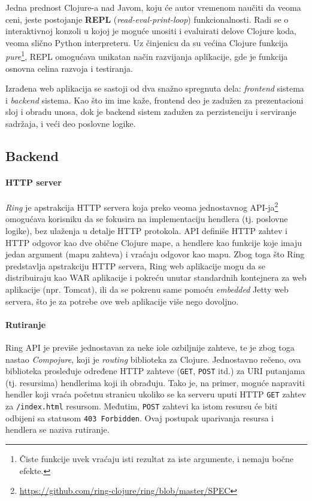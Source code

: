 Jedna prednost Clojure-a nad Javom, koju će autor vremenom naučiti da veoma ceni, jeste postojanje \textbf{REPL} (\textit{read-eval-print-loop}) funkcionalnosti. Radi se o interaktivnoj konzoli u kojoj je moguće unositi i evaluirati delove Clojure koda, veoma slično Python interpreteru. Uz činjenicu da su većina Clojure funkcija \textit{pure}\footnote{Čiste funkcije uvek vraćaju isti rezultat za iste argumente, i nemaju bočne efekte.}, REPL omogućava unikatan način razvijanja aplikacije, gde je funkcija osnovna celina razvoja i testiranja.

Izrađena web aplikacija se sastoji od dva snažno spregnuta dela: \emph{frontend} sistema i \emph{backend} sistema. Kao što im ime kaže, frontend deo je zadužen za prezentacioni sloj i obradu unosa, dok je backend sistem zadužen za perzistenciju i serviranje sadržaja, i veći deo poslovne logike.

\subsection{Backend}

\paragraph{HTTP server}
\emph{Ring}\cite{ring} je apstrakcija HTTP servera koja preko veoma jednostavnog API-ja\footnote{\url{https://github.com/ring-clojure/ring/blob/master/SPEC}} omogućava korisniku da se fokusira na implementaciju hendlera (tj. poslovne logike), bez ulaženja u detalje HTTP protokola. API definiše HTTP zahtev i HTTP odgovor kao dve obične Clojure mape, a hendlere kao funkcije koje imaju jedan argument (mapu zahteva) i vraćaju odgovor kao mapu. Zbog toga što Ring predstavlja apstrakciju HTTP servera, Ring web aplikacije mogu da se distribuiraju kao WAR aplikacije i pokreću unutar standardnih kontejnera za web aplikacije (npr. Tomcat), ili da se pokrenu same pomoću \textit{embedded} Jetty web servera, što je za potrebe ove web aplikacije više nego dovoljno.

\paragraph{Rutiranje}
Ring API je previše jednostavan za neke iole ozbiljnije zahteve, te je zbog toga nastao \emph{Compojure}\cite{compojure}, koji je \textit{routing} biblioteka za Clojure. Jednostavno rečeno, ova biblioteka prosleđuje određene HTTP zahteve (\texttt{GET}, \texttt{POST} itd.) za URI putanjama (tj. resursima) hendlerima koji ih obrađuju. Tako je, na primer, moguće napraviti hendler koji vraća početnu stranicu ukoliko se ka serveru uputi HTTP \texttt{GET} zahtev za \texttt{/index.html} resursom. Međutim, \texttt{POST} zahtevi ka istom resursu će biti odbijeni sa statusom \texttt{403 Forbidden}. Ovaj postupak uparivanja resursa i hendlera se naziva rutiranje.

